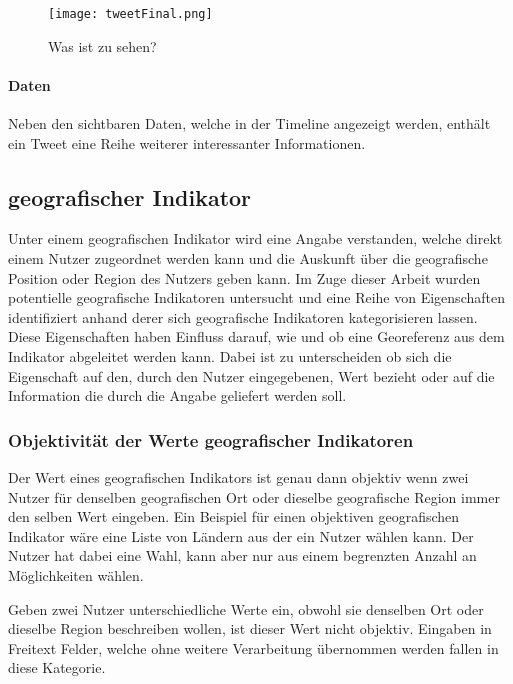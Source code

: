 			\begin{figure}[h!]
			\begin{center}
			\texttt{[image: tweetFinal.png]}
			\caption{Was ist zu sehen?}
			\label{tweet}
			\end{center}
			\end{figure}	


		 	\paragraph{Daten}
		 		Neben den sichtbaren Daten, welche in der Timeline angezeigt werden, enthält ein Tweet eine Reihe weiterer interessanter Informationen. 	


		 \subsection{geografischer Indikator}
		
			Unter einem geografischen Indikator wird eine Angabe verstanden, welche direkt einem Nutzer zugeordnet werden kann und die Auskunft über die geografische Position oder Region des Nutzers geben kann.
			Im Zuge dieser Arbeit wurden potentielle geografische Indikatoren untersucht und eine Reihe von Eigenschaften identifiziert anhand derer sich geografische Indikatoren kategorisieren lassen. 
			Diese Eigenschaften haben Einfluss darauf, wie und ob eine Georeferenz aus dem Indikator abgeleitet werden kann.
			Dabei ist zu unterscheiden ob sich die Eigenschaft auf den, durch den Nutzer eingegebenen, Wert bezieht oder auf die Information die durch die Angabe geliefert werden soll. 

			\subsubsection{Objektivität der Werte geografischer Indikatoren} 
				
				Der Wert eines geografischen Indikators ist genau dann objektiv wenn zwei Nutzer für denselben geografischen Ort oder dieselbe geografische Region immer den selben Wert eingeben.
				Ein Beispiel für einen objektiven geografischen Indikator wäre eine Liste von Ländern aus der ein Nutzer wählen kann.
				Der Nutzer hat dabei eine Wahl, kann aber nur aus einem begrenzten Anzahl an Möglichkeiten wählen. 

				Geben zwei Nutzer unterschiedliche Werte ein, obwohl sie denselben Ort oder dieselbe Region beschreiben wollen, ist dieser Wert nicht objektiv.
				Eingaben in Freitext Felder, welche ohne weitere Verarbeitung übernommen werden fallen in diese Kategorie.

